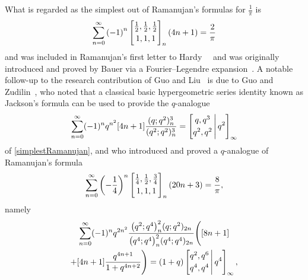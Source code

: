 \documentclass[12pt]{article}
\begin{document}
 What is regarded as the simplest out of Ramanujan's formulas for $\frac{1}{\pi}$ is 
\begin{equation}\label{simplestRamanujan}
 \sum_{n = 
 0}^{\infty} \left( -1 \right)^{n} 
 \left[ \begin{matrix} \frac{1}{2}, \frac{1}{2}, \frac{1}{2} \vspace{1mm} \\ 
 1, 1, 1 \end{matrix} \right]_{n} (4n+1) = \frac{2}{\pi}
\end{equation}
 and was included in Ramanujan's first letter to Hardy~\cite[pp.\ 23--24]{Berndt1994ParII}~\cite[p.\ xxvi]{Ramanujan1962} 
 and was originally introduced and proved by Bauer via a Fourier--Legendre expansion~\cite{Bauer1859}. 
 A notable follow-up to the research contribution of 
 Guo and Liu~\cite{GuoLiu2018} is due to Guo and Zudilin~\cite{GuoZudilin2018}, 
 who noted that a classical basic hypergeometric series identity 
 known as Jackson's formula can be used to provide 
 the $q$-analogue 
 $$ \sum_{n=0}^{\infty} (-1)^n q^{n^2} [4n+1] 
 \frac{ (q;q^2)_{n}^{3} }{ (q^2;q^2)_{n}^{3} } 
 = \left[ \begin{matrix} q, q^3 \vspace{1mm} \\ 
 q^2, q^2 \end{matrix} \, \Bigg| \, q^2 \right]_{\infty} $$ 
 of \eqref{simplestRamanujan}, and who introduced and proved 
 a $q$-analogue of Ramanujan's formula 
 \begin{equation}\label{Ramanujannegquart}
 \sum_{n = 0}^{\infty} \left( -\frac{1}{4} \right)^{n} 
 \left[ \begin{matrix} \frac{1}{4}, \frac{1}{2}, \frac{3}{4} \vspace{1mm} \\ 
 1, 1, 1 \end{matrix} \right]_{n} (20 n + 3) = \frac{8}{\pi}, 
\end{equation}
 namely 
\begin{multline*}
 \sum_{n=0}^{\infty} 
 (-1)^n q^{2n^2} 
 \frac{ \big( q^2;q^4 \big)_{n}^{2} (q;q^2)_{2n} }{ \big( q^4;q^4 \big)_{n}^2 
 (q^4;q^4)_{2n} } \Bigg( [8n+1] \\ 
 + [4n+1] \frac{q^{4n+1}}{1+q^{4n+2}} \Bigg) = (1+q) 
 \left[ \begin{matrix} q^2, q^6 \vspace{1mm} \\ 
 q^4, q^4 \end{matrix} \, \Bigg| \, q^4 \right]_{\infty}, 
\end{multline*}
\end{document}
